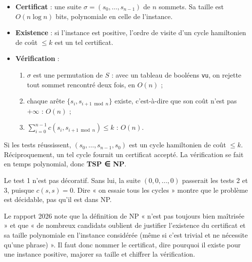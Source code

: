 \documentclass[11pt,a4paper]{article}
\providecommand{\tightlist}{\setlength{\itemsep}{0pt}\setlength{\parskip}{0pt}}
\begin{document}
\begin{itemize}
\tightlist
\item
  \textbf{Certificat} : une suite \(\sigma=(s_0,\dots,s_{n-1})\) de \(n\) sommets. Sa taille est \(O(n\log n)\) bits, polynomiale en celle de l'instance.
\item
  \textbf{Existence} : si l'instance est positive, l'ordre de visite d'un cycle hamiltonien de coût \(\le k\) est un tel certificat.
\item
  \textbf{Vérification} :

  \begin{enumerate}
  \def\labelenumi{\arabic{enumi}.}
  \tightlist
  \item
    \(\sigma\) est une permutation de \(S\) : avec un tableau de booléens \texttt{vu}, on rejette tout sommet rencontré deux fois, en \(O(n)\) ;
  \item
    chaque arête \(\{s_i,s_{i+1\bmod n}\}\) existe, c'est-à-dire que son coût n'est pas \(+\infty\) : \(O(n)\) ;
  \item
    \(\sum_{i=0}^{n-1}c(s_i,s_{i+1\bmod n})\le k\) : \(O(n)\).
  \end{enumerate}
\end{itemize}

Si les tests réussissent, \((s_0,\dots,s_{n-1},s_0)\) est un cycle hamiltonien de coût \(\le k\). Réciproquement, un tel cycle fournit un certificat accepté. La vérification se fait en temps polynomial, donc \textbf{TSP ∈ NP}.

\begin{piege}

Le test 1 n'est pas décoratif. Sans lui, la suite \((0,0,\dots,0)\) passerait les tests 2 et 3, puisque \(c(s,s)=0\). Dire « on essaie tous les cycles » montre que le problème est décidable, pas qu'il est dans NP.

\end{piege}

\begin{jury}

Le rapport 2026 note que la définition de NP « n'est pas toujours bien maîtrisée » et que « de nombreux candidats oublient de justifier l'existence du certificat et sa taille polynomiale en l'instance considérée (même si c'est trivial et ne nécessite qu'une phrase) ». Il faut donc nommer le certificat, dire pourquoi il existe pour une instance positive, majorer sa taille et chiffrer la vérification.

\end{jury}
\end{document}
